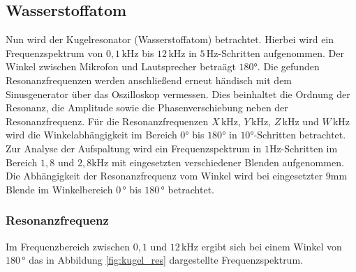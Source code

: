 \begin{figure}[H]
    \hfil
    \caption{}\label{figure}
\end{figure}

\subsection{Wasserstoffatom}
Nun wird der Kugelresonator (Wasserstoffatom) betrachtet. Hierbei wird ein Frequenzspektrum
von $0,1\,$kHz bis $12\,$kHz in $5\,$Hz-Schritten aufgenommen. Der Winkel zwischen Mikrofon und Lautsprecher betraägt $180°$.
Die gefunden Resonanzfrequenzen werden anschließend erneut händisch mit dem Sinusgenerator über das Oszilloskop vermessen.
Dies beinhaltet die Ordnung der Resonanz, die Amplitude sowie die Phasenverschiebung neben der Resonanzfrequenz.
Für die Resonanzfrequenzen $X\,$kHz, $Y\,$kHz, $Z\,$kHz und $W\,$kHz wird die Winkelabhängigkeit im Bereich $0°$ bis $180°$ in $10°$-Schritten betrachtet.\\
Zur Analyse der Aufspaltung wird ein Frequenzspektrum in $1$Hz-Schritten im Bereich $1,8$ und $2,8$kHz mit eingesetzten
verschiedener Blenden aufgenommen. Die Abhängigkeit der Resonanzfrequenz vom Winkel wird bei eingesetzter $9$mm Blende 
im Winkelbereich $0\,°$ bis $180\,°$ betrachtet.

\subsubsection*{Resonanzfrequenz}
Im Frequenzbereich zwischen $0,1$ und $12\,$kHz ergibt sich bei einem Winkel von $180\,°$ das in Abbildung \ref{fig:kugel_res}
dargestellte Frequenzspektrum.


